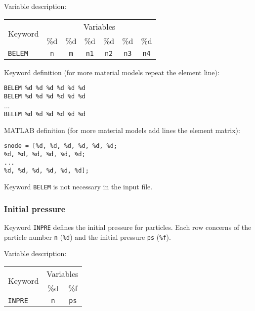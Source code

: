 Variable description:

\begin{tabular}{|l|c|c|c|c|c|c|}
\hline
\multirow{2}{*}{Keyword} & \multicolumn{6}{c|}{Variables} \\ \cline{2-7}
& \%d & \%d & \%d & \%d & \%d & \%d \\ \hline
\texttt{BELEM} & \texttt{n} & \texttt{m} & \texttt{n1} & \texttt{n2} & \texttt{n3} & \texttt{n4} \\ \hline
\end{tabular}

Keyword definition (for more material models repeat the element line):

\begin{tcolorbox}
\texttt{BELEM \%d \%d \%d \%d \%d \%d} \\
\texttt{BELEM \%d \%d \%d \%d \%d \%d} \\
... \\
\texttt{BELEM \%d \%d \%d \%d \%d \%d}
\end{tcolorbox}

MATLAB definition (for more material models add lines the element matrix):

\begin{tcolorbox}
\texttt{snode = [\%d, \%d, \%d, \%d, \%d, \%d; \\
\%d, \%d, \%d, \%d, \%d, \%d; \\
... \\
\%d, \%d, \%d, \%d, \%d, \%d];}
\end{tcolorbox}

Keyword \texttt{BELEM} is not necessary in the input file.


\subsubsection{Initial pressure}

Keyword \texttt{INPRE} defines the initial pressure for particles. Each row concerns of the particle number \texttt{n} (\texttt{\%d}) and the initial pressure \texttt{ps} (\texttt{\%f}).

Variable description:

\begin{tabular}{|l|c|c|}
\hline
\multirow{2}{*}{Keyword} & \multicolumn{2}{c|}{Variables} \\ \cline{2-3}
& \%d & \%f \\ \hline
\texttt{INPRE} & \texttt{n} & \texttt{ps} \\ \hline
\end{tabular}


